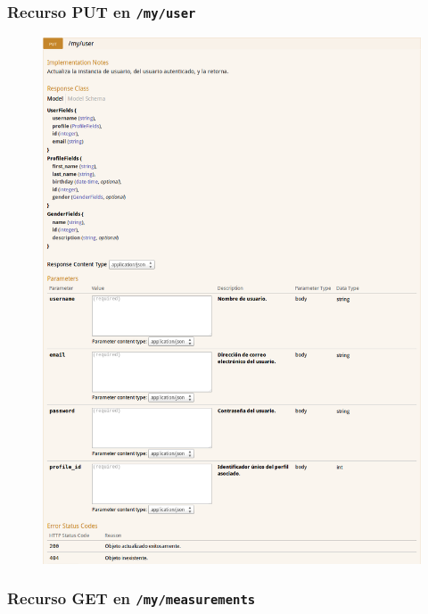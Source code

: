 \newpage


\subsubsection{Recurso PUT en \texttt{/my/user}}

\begin{figure}[h]
  \centering
  \includegraphics[width=\textwidth,height=.75\textheight,keepaspectratio]{img/especificacion_api/myUserView_put}
  \label{myUserView_put}
\end{figure}

\newpage


\subsubsection{Recurso GET en \texttt{/my/measurements}}

